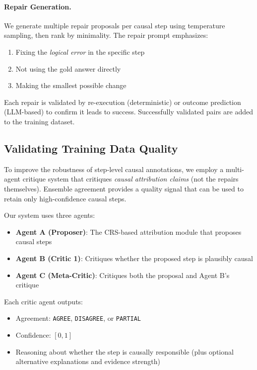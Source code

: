 \documentclass{article}
\theoremstyle{plain}
\theoremstyle{definition}
\theoremstyle{remark}
\begin{document}
\paragraph{Repair Generation.}
We generate multiple repair proposals per causal step using temperature sampling, then rank by minimality. The repair prompt emphasizes:
\begin{enumerate}
    \item Fixing the \emph{logical error} in the specific step
    \item Not using the gold answer directly
    \item Making the smallest possible change
\end{enumerate}

Each repair is validated by re-execution (deterministic) or outcome prediction (LLM-based) to confirm it leads to success. Successfully validated pairs are added to the training dataset.

\subsection{Validating Training Data Quality}

To improve the robustness of step-level causal annotations, we employ a multi-agent critique system that critiques \emph{causal attribution claims} (not the repairs themselves). Ensemble agreement provides a quality signal that can be used to retain only high-confidence causal steps.

Our system uses three agents:
\begin{itemize}
    \item \textbf{Agent A (Proposer)}: The CRS-based attribution module that proposes causal steps
    \item \textbf{Agent B (Critic 1)}: Critiques whether the proposed step is plausibly causal
    \item \textbf{Agent C (Meta-Critic)}: Critiques both the proposal and Agent B's critique
\end{itemize}

Each critic agent outputs:
\begin{itemize}
    \item Agreement: \texttt{AGREE}, \texttt{DISAGREE}, or \texttt{PARTIAL}
    \item Confidence: $[0, 1]$
    \item Reasoning about whether the step is causally responsible (plus optional alternative explanations and evidence strength)
\end{itemize}
\end{document}
